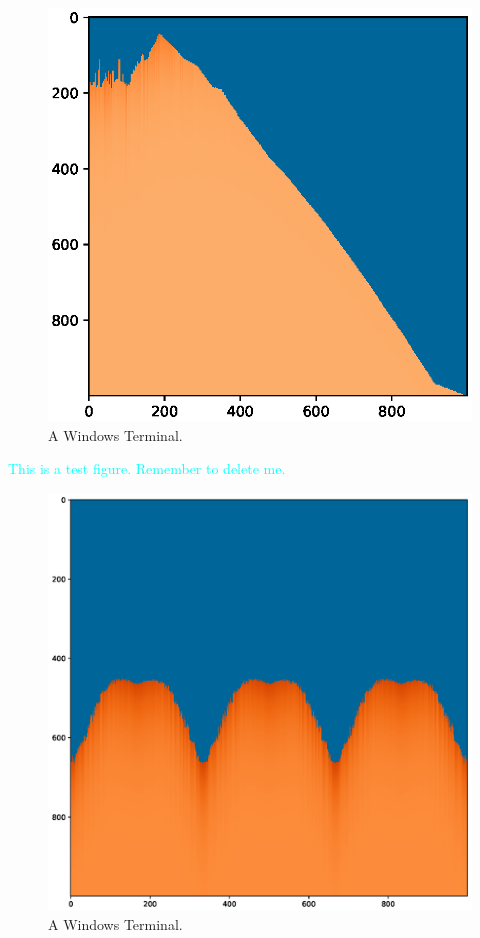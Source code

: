 \documentclass[12pt]{article}
\begin{document}
\begin{figure}[H]
    \includegraphics[width=\linewidth]{Figure_1.eps}
    \caption{A Windows Terminal.}
    \label{fig:Terminal}
\end{figure}
\textcolor{cyan}{This is a test figure. Remember to delete me.}
\begin{figure}[H]
    \includegraphics[width=\linewidth]{Figure_2.eps}
    \caption{A Windows Terminal.}
    \label{fig:Terminal}
\end{figure}
\end{document}

